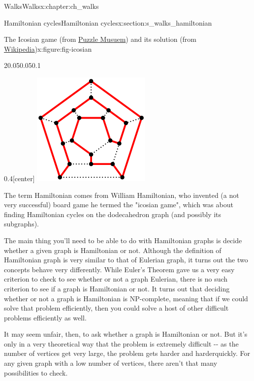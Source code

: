 \documentclass[oneside,10pt,]{book}
\numberwithin{equation}{section}
\begin{document}
\begin{chapterptx}{Walks}{}{Walks}{}{}{x:chapter:ch_walks}
\begin{sectionptx}{Hamiltonian cycles}{}{Hamiltonian cycles}{}{}{x:section:s_walks_hamiltonian}
\begin{figureptx}{The Icosian game (from \href{https://www.puzzlemuseum.com/month/picm02/200207icosian.htm}{Puzzle Musuem}) and its solution (from \href{https://en.wikipedia.org/wiki/Icosian_game}{Wikipedia})}{x:figure:fig-icosian}{}
\begin{sidebyside}{2}{0.05}{0.05}{0.1}
\begin{sbspanel}{0.4}[center]
\includegraphics[width=\linewidth]{images/icosiansolved.png}
\end{sbspanel}%
\end{sidebyside}%
\tcblower
\end{figureptx}%
The term Hamiltonian comes from William Hamiltonian, who invented (a not very successful) board game he termed the "icosian game", which was about finding Hamiltonian cycles on the dodecahedron graph (and possibly its subgraphs).%
\par
The main thing you'll need to be able to do with Hamiltonian graphs is decide whether a given graph is Hamiltonian or not.  Although the definition of Hamiltonian graph is very similar to that of Eulerian graph, it turns out the two concepts behave very differently.  While Euler's Theorem gave us a very easy criterion to check to see whether or not a graph Eulerian, there is no such criterion to see if a graph is Hamiltonian or not.  It turns out that deciding whether or not a graph is Hamiltonian is NP-complete, meaning that if we could solve that problem efficiently, then you could solve a host of other difficult problems efficiently as well.%
\par
It may seem unfair, then, to ask whether a graph is Hamiltonian or not.  But it's only in a very theoretical way that the problem is extremely difficult -{}-{} as the number of vertices get very large, the problem gets harder and harderquickly.  For any given graph with a low number of vertices, there aren't that many possibilities to check.%

\end{sectionptx}
\end{chapterptx}
\end{document}

